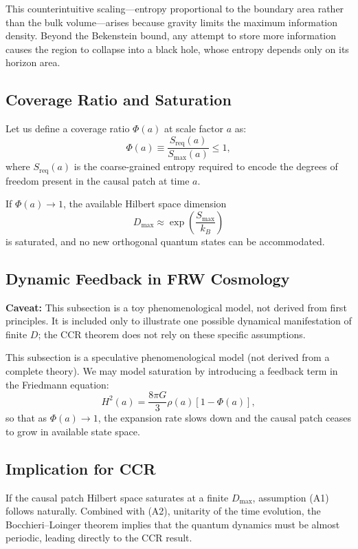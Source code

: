 \documentclass[12pt]{article}
\theoremstyle{remark}
\begin{document}
This counterintuitive scaling---entropy proportional to the boundary area rather than the bulk volume---arises because gravity 
limits the maximum information density. Beyond the Bekenstein bound, any attempt to store more information causes the region 
to collapse into a black hole, whose entropy depends only on its horizon area.


\subsection{Coverage Ratio and Saturation}
Let us define a coverage ratio \(\Phi(a)\) at scale factor \(a\) as:
\begin{equation}
\Phi(a) \equiv \frac{S_{\mathrm{req}}(a)}{S_{\max}(a)} \le 1,
\end{equation}
where \(S_{\mathrm{req}}(a)\) is the coarse-grained entropy required to encode the degrees of freedom present in the causal patch at time \(a\).

If \(\Phi(a) \to 1\), the available Hilbert space dimension
\begin{equation}
D_{\max} \approx \exp\left( \frac{S_{\max}}{k_B} \right)
\end{equation}
is saturated, and no new orthogonal quantum states can be accommodated.

\subsection{Dynamic Feedback in FRW Cosmology}
\textbf{Caveat:} This subsection is a toy phenomenological model, not derived from first principles. 
It is included only to illustrate one possible dynamical manifestation of finite $D$; 
the CCR theorem does not rely on these specific assumptions.

This subsection is a speculative phenomenological model (not derived from a complete theory). We may model saturation by introducing a feedback term in the Friedmann equation:
\begin{equation}
H^2(a) = \frac{8\pi G}{3} \rho(a) \left[1 - \Phi(a)\right],
\end{equation}
so that as \(\Phi(a) \to 1\), the expansion rate slows down and the causal patch ceases to grow in available state space.

\subsection{Implication for CCR}
If the causal patch Hilbert space saturates at a finite \(D_{\max}\), assumption (A1) follows naturally. Combined with (A2), unitarity of the time evolution, the Bocchieri--Loinger theorem implies that the quantum dynamics must be almost periodic, leading directly to the CCR result.
\end{document}
